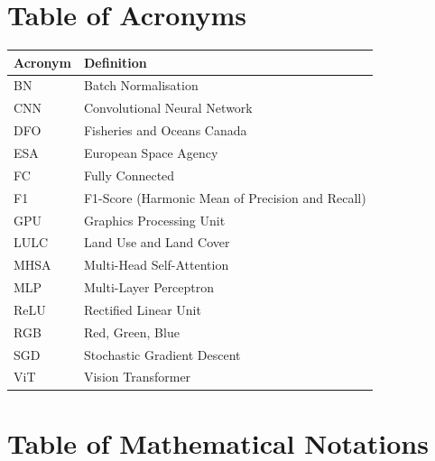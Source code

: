 \documentclass[12pt, letterpaper]{article}
\begin{document}
\newpage

\section*{Table of Acronyms}

\begin{tabular}{@{}L{3cm} L{10cm}@{}}
    \toprule
    \textbf{Acronym} & \textbf{Definition} \\
    \midrule
    BN    & Batch Normalisation \\
    CNN   & Convolutional Neural Network \\
    DFO   & Fisheries and Oceans Canada \\
    ESA   & European Space Agency \\
    FC    & Fully Connected \\
    F1    & F1-Score (Harmonic Mean of Precision and Recall) \\
    GPU   & Graphics Processing Unit \\
    LULC  & Land Use and Land Cover \\
    MHSA  & Multi-Head Self-Attention \\
    MLP   & Multi-Layer Perceptron \\
    ReLU  & Rectified Linear Unit \\
    RGB   & Red, Green, Blue \\
    SGD   & Stochastic Gradient Descent \\
    ViT   & Vision Transformer \\
    \bottomrule
\end{tabular}

\newpage

\section*{Table of Mathematical Notations}
\end{document}
